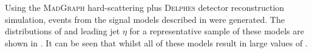 Using the \textsc{MadGraph} hard-scattering plus \textsc{Delphes} detector reconstruction simulation, events from the signal models described in  were generated. The distributions of \MET and leading jet $\eta$ for a representative sample of these models are shown in . It can be seen that whilst all of these models result in large values of \MET.

\begin{figure}

\end{figure}
